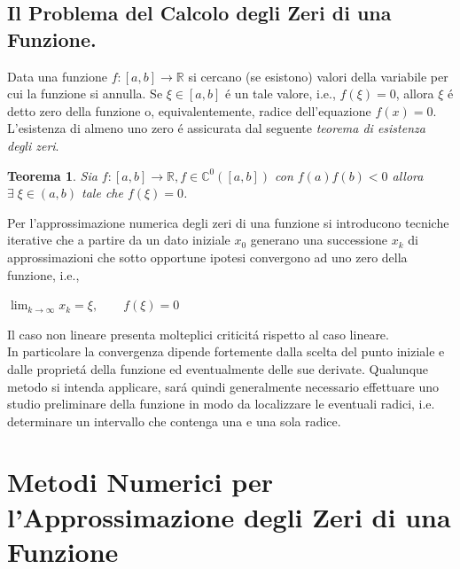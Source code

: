 \documentclass[12pt, letterpaper]{article}
\newtheorem{theorem}{Teorema}
\begin{document}
\subsection{Il Problema del Calcolo degli Zeri di una Funzione.}

Data una funzione $f \colon [a,b] \to \mathbb{R}$ si cercano (se esistono) valori
della variabile per cui la funzione si annulla. Se $ \xi \in [a, b] $ \'e un tale valore,
i.e., $f(\xi) = 0$, allora $ \xi $ \'e detto zero della funzione o, equivalentemente, radice
dell’equazione $f(x) = 0$. \\
L'esistenza di almeno uno zero \'e assicurata dal seguente \textit{teorema di esistenza degli zeri}.
\begin{theorem}
    Sia $f \colon [a,b] \to \mathbb{R}, f \in \mathbb{C}^0([a,b])$ con $f(a)f(b)<0$ allora $\exists \; \xi \in (a,b)$ tale che $f(\xi)=0$.
\end{theorem}
Per l’approssimazione numerica degli zeri di una funzione si introducono
tecniche iterative che a partire da un dato iniziale $x_0$ generano una successione
{$x_k$} di approssimazioni che sotto opportune ipotesi convergono ad uno zero
della funzione, i.e.,
\begin{center}   
    $\lim_{k \to \infty} x_k=\xi, \qquad  f(\xi)=0$
\end{center}
Il caso non lineare presenta molteplici criticit\'a rispetto al caso lineare. \\In
particolare la convergenza dipende fortemente dalla scelta del punto iniziale e
dalle propriet\'a della funzione ed eventualmente delle sue derivate. Qualunque
metodo si intenda applicare, sar\'a quindi generalmente necessario effettuare uno
studio preliminare della funzione in modo da localizzare le eventuali radici, i.e.
determinare un intervallo che contenga una e una sola radice.

\newpage

\section{Metodi Numerici per l’Approssimazione degli Zeri di una Funzione}
\end{document}
